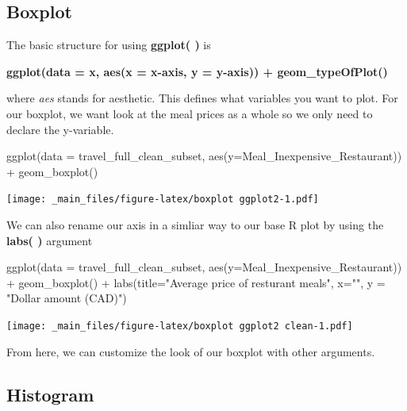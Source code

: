 \documentclass[
]{book}
\newenvironment{Shaded}{\begin{snugshade}}{\end{snugshade}}
\newcommand{\AttributeTok}[1]{\textcolor[rgb]{0.77,0.63,0.00}{#1}}
\newcommand{\FunctionTok}[1]{\textcolor[rgb]{0.00,0.00,0.00}{#1}}
\newcommand{\NormalTok}[1]{#1}
\newcommand{\SpecialCharTok}[1]{\textcolor[rgb]{0.00,0.00,0.00}{#1}}
\newcommand{\StringTok}[1]{\textcolor[rgb]{0.31,0.60,0.02}{#1}}
\begin{document}
\hypertarget{boxplot}{%
\subsection{Boxplot}\label{boxplot}}

The basic structure for using \textbf{ggplot( )} is

\textbf{ggplot(data = x, aes(x = x-axis, y = y-axis)) + geom\_typeOfPlot() }

where \emph{aes} stands for aesthetic. This defines what variables you want to plot. For our boxplot, we want look at the meal prices as a whole so we only need to declare the y-variable.

\begin{Shaded}
\begin{Highlighting}[]
\FunctionTok{ggplot}\NormalTok{(}\AttributeTok{data =}\NormalTok{ travel\_full\_clean\_subset, }\FunctionTok{aes}\NormalTok{(}\AttributeTok{y=}\NormalTok{Meal\_Inexpensive\_Restaurant)) }\SpecialCharTok{+} 
  \FunctionTok{geom\_boxplot}\NormalTok{()}
\end{Highlighting}
\end{Shaded}

\texttt{[image: \_main\_files/figure-latex/boxplot ggplot2-1.pdf]}

We can also rename our axis in a simliar way to our base R plot by using the \textbf{labs( )} argument

\begin{Shaded}
\begin{Highlighting}[]
\FunctionTok{ggplot}\NormalTok{(}\AttributeTok{data =}\NormalTok{ travel\_full\_clean\_subset, }\FunctionTok{aes}\NormalTok{(}\AttributeTok{y=}\NormalTok{Meal\_Inexpensive\_Restaurant)) }\SpecialCharTok{+} 
  \FunctionTok{geom\_boxplot}\NormalTok{() }\SpecialCharTok{+}
  \FunctionTok{labs}\NormalTok{(}\AttributeTok{title=}\StringTok{"Average price of resturant meals"}\NormalTok{,}
       \AttributeTok{x=}\StringTok{""}\NormalTok{, }
       \AttributeTok{y =} \StringTok{"Dollar amount (CAD)"}\NormalTok{)}
\end{Highlighting}
\end{Shaded}

\texttt{[image: \_main\_files/figure-latex/boxplot ggplot2 clean-1.pdf]}

From here, we can customize the look of our boxplot with other arguments.

\hypertarget{histogram-1}{%
\subsection{Histogram}\label{histogram-1}}
\end{document}
